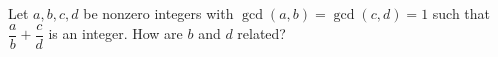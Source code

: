 Let $a,b,c,d$ be nonzero integers with $\gcd(a,b)=\gcd(c,d)=1$ such that $\dfrac ab+\dfrac cd$ is an integer. How are $b$ and $d$ related?
